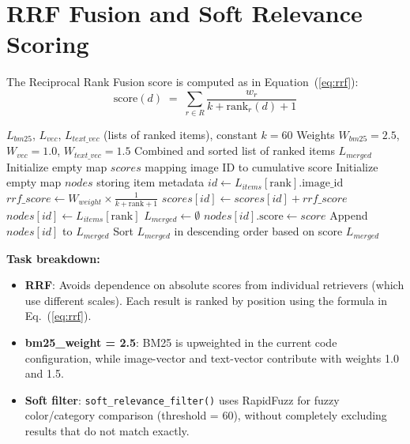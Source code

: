 \section{RRF Fusion and Soft Relevance Scoring}

The Reciprocal Rank Fusion score is computed as in Equation~(\ref{eq:rrf}):
\begin{equation}
\label{eq:rrf}
\text{score}(d) \;=\; \sum_{r \in R} \frac{w_r}{k + \text{rank}_r(d) + 1}
\end{equation}

\begin{algorithm}[H]
\caption{Reciprocal Rank Fusion (RRF) for Hybrid Retrieval}\label{alg:rrf}
\begin{algorithmic}[1]
\Require $L_{bm25}$, $L_{vec}$, $L_{text\_vec}$ (lists of ranked items), constant $k = 60$
\Require Weights $W_{bm25} = 2.5$, $W_{vec} = 1.0$, $W_{text\_vec} = 1.5$
\Ensure Combined and sorted list of ranked items $L_{merged}$
\State Initialize empty map $scores$ mapping image ID to cumulative score
\State Initialize empty map $nodes$ storing item metadata
        \State $id \gets L_{items}[\text{rank}].\text{image\_id}$
        \State $rrf\_score \gets W_{weight} \times \frac{1}{k + \text{rank} + 1}$
        \State $scores[id] \gets scores[id] + rrf\_score$
            \State $nodes[id] \gets L_{items}[\text{rank}]$
        \EndIf
    \EndFor
\EndProcedure
\State {}
\State {}
    \State {}
\EndIf
\State $L_{merged} \gets \emptyset$
    \State $nodes[id].\text{score} \gets score$
    \State Append $nodes[id]$ to $L_{merged}$
\EndFor
\State Sort $L_{merged}$ in descending order based on score
\State \Return $L_{merged}$
\end{algorithmic}
\end{algorithm}

\textbf{Task breakdown:}
\begin{itemize}
    \item \textbf{RRF}: Avoids dependence on absolute scores from individual retrievers (which use different scales). Each result is ranked by position using the formula in Eq.~(\ref{eq:rrf}).
    \item \textbf{bm25\_weight = 2.5}: BM25 is upweighted in the current code configuration, while image-vector and text-vector contribute with weights 1.0 and 1.5.
    \item \textbf{Soft filter}: \texttt{soft\_relevance\_filter()} uses RapidFuzz for fuzzy color/category comparison (threshold = 60), without completely excluding results that do not match exactly.
\end{itemize}


